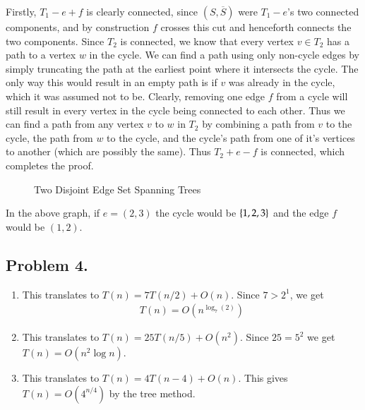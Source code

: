 \documentclass[12pt]{article}
\theoremstyle{definitionstyle}
\newcommand{\SET}[1]{\Set{\mskip-\medmuskip #1 \mskip-\medmuskip}}
\begin{document}
    Firstly, $T_1-e+f$ is clearly connected, since $(S, \overline S)$ were $T_1 - e$'s two connected components, and by construction $f$ crosses this cut and henceforth connects the two components. Since $T_2$ is connected, we know that every vertex $v \in T_2$ has a path to a vertex $w$ in the cycle. We can find a path using only non-cycle edges by simply truncating the path at the earliest point where it intersects the cycle. The only way this would result in an empty path is if $v$ was already in the cycle, which it was assumed not to be. Clearly, removing one edge $f$ from a cycle will still result in every vertex in the cycle being connected to each other. Thus we can find a path from any vertex $v$ to $w$ in $T_2$ by combining a path from $v$ to the cycle, the path from $w$ to the cycle, and the cycle's path from one of it's vertices to another (which are possibly the same). Thus $T_2 + e - f$ is connected, which completes the proof.
    \begin{figure}[H]
        \centering
        \caption{Two Disjoint Edge Set Spanning Trees}
    \end{figure}
    In the above graph, if $e = (2,3)$ the cycle would be $\SET{1, 2, 3}$ and the edge $f$ would be $(1, 2)$.

    \subsection*{Problem 4.} 
    \begin{enumerate}[label=\alph*)]
        \item This translates to $T(n) = 7T(n/2) + O(n)$. Since $7 > 2^1$, we get 
        \begin{align*}
            T(n) = O(n^{\log_7(2)})
        \end{align*}
        
        \item This translates to $T(n) = 25T(n/5) + O(n^2)$. Since $25 = 5^2$ we get $T(n) = O(n^2\log n)$.
        \item This translates to $T(n) = 4T(n-4) + O(n)$. This gives $T(n) = O(4^{n/4})$ by the tree method.
    \end{enumerate}
\end{document}
